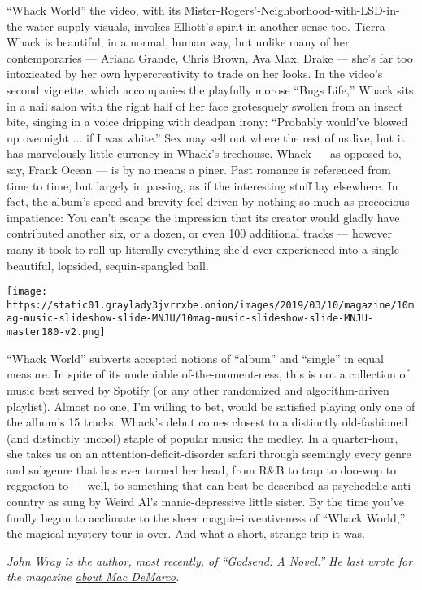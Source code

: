 ``Whack World'' the video, with its
Mister-Rogers'-Neighborhood-with-LSD-in-the-water-supply visuals,
invokes Elliott's spirit in another sense too. Tierra Whack is
beautiful, in a normal, human way, but unlike many of her contemporaries
--- Ariana Grande, Chris Brown, Ava Max, Drake --- she's far too
intoxicated by her own hypercreativity to trade on her looks. In the
video's second vignette, which accompanies the playfully morose ``Bugs
Life,'' Whack sits in a nail salon with the right half of her face
grotesquely swollen from an insect bite, singing in a voice dripping
with deadpan irony: ``Probably would've blowed up overnight ... if I was
white.'' Sex may sell out where the rest of us live, but it has
marvelously little currency in Whack's treehouse. Whack --- as opposed
to, say, Frank Ocean --- is by no means a piner. Past romance is
referenced from time to time, but largely in passing, as if the
interesting stuff lay elsewhere. In fact, the album's speed and brevity
feel driven by nothing so much as precocious impatience: You can't
escape the impression that its creator would gladly have contributed
another six, or a dozen, or even 100 additional tracks --- however many
it took to roll up literally everything she'd ever experienced into a
single beautiful, lopsided, sequin-spangled ball.

\texttt{[image: https://static01.graylady3jvrrxbe.onion/images/2019/03/10/magazine/10mag-music-slideshow-slide-MNJU/10mag-music-slideshow-slide-MNJU-master180-v2.png]}

``Whack World'' subverts accepted notions of ``album'' and ``single'' in
equal measure. In spite of its undeniable of-the-moment-ness, this is
not a collection of music best served by Spotify (or any other
randomized and algorithm-driven playlist). Almost no one, I'm willing to
bet, would be satisfied playing only one of the album's 15 tracks.
Whack's debut comes closest to a distinctly old-fashioned (and
distinctly uncool) staple of popular music: the medley. In a
quarter-hour, she takes us on an attention-deficit-disorder safari
through seemingly every genre and subgenre that has ever turned her
head, from R\&B to trap to doo-wop to reggaeton to --- well, to
something that can best be described as psychedelic anti-country as sung
by Weird Al's manic-depressive little sister. By the time you've finally
begun to acclimate to the sheer magpie-inventiveness of ``Whack World,''
the magical mystery tour is over. And what a short, strange trip it was.

\emph{John Wray is the author, most recently, of ``Godsend: A Novel.''
He last wrote for the magazine
\href{https://www.nytimes3xbfgragh.onion/interactive/2016/03/10/magazine/25-songs-that-tell-us-where-music-is-going.html\#/mac-demarco-blue-boy}{about
Mac DeMarco}.}

